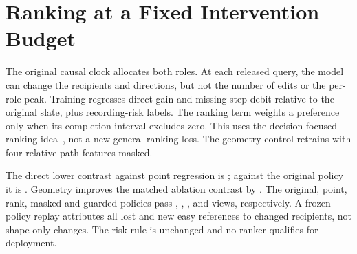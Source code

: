 \section{Ranking at a Fixed Intervention Budget}

The original causal clock allocates both roles. At each
released query, the model can change the recipients and
directions, but not the number of edits or the per-role peak.
Training regresses direct gain and missing-step debit relative
to the original slate, plus recording-risk labels. The
ranking term weights a preference only when its completion
interval excludes zero. This uses the decision-focused
ranking idea~\cite{mandi2022rank}, not a new general ranking loss.
The geometry control retrains with four relative-path
features masked.

The direct lower contrast against point regression is
\BudgetRankPrimaryEffect{}; against the original policy it is
\BudgetRankOriginalEffect{}. Geometry improves the matched
ablation contrast by \BudgetRankGeometryEffect{}. The original,
point, rank, masked and guarded policies pass
\BudgetRankOriginalJoint{}, \BudgetRankPointJoint{},
\BudgetRankRankJoint{}, \BudgetRankMaskedJoint{} and
\BudgetRankGuardJoint{} views, respectively. A frozen
policy replay attributes all \BudgetRankLost{} lost and
\BudgetRankNew{} new easy references to changed
recipients, not shape-only changes. The risk rule is unchanged
and no ranker qualifies for deployment.
